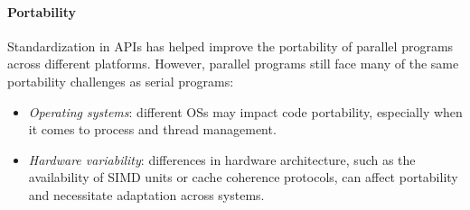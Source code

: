 \paragraph*{Portability}
Standardization in APIs has helped improve the portability of parallel programs across different platforms. 
However, parallel programs still face many of the same portability challenges as serial programs:
\begin{itemize}
    \item \textit{Operating systems}: different OSs may impact code portability, especially when it comes to process and thread management.
    \item \textit{Hardware variability}: differences in hardware architecture, such as the availability of SIMD units or cache coherence protocols, can affect portability and necessitate adaptation across systems.
\end{itemize}